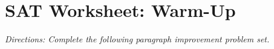 \section{SAT Worksheet: Warm-Up}

\textit{Directions: Complete the following paragraph improvement problem set.}